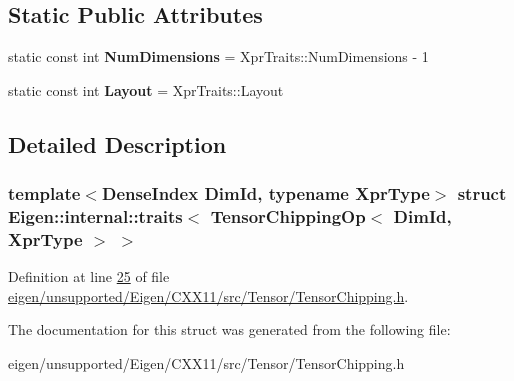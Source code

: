 \subsection*{Static Public Attributes}
\begin{DoxyCompactItemize}
\item 
\mbox{\label{struct_eigen_1_1internal_1_1traits_3_01_tensor_chipping_op_3_01_dim_id_00_01_xpr_type_01_4_01_4_a1204a7d5624c628ff5e05478ed5589eb}} 
static const int {\bfseries Num\+Dimensions} = Xpr\+Traits\+::\+Num\+Dimensions -\/ 1
\item 
\mbox{\label{struct_eigen_1_1internal_1_1traits_3_01_tensor_chipping_op_3_01_dim_id_00_01_xpr_type_01_4_01_4_ae6d8e138be67099dc979aebd983e0523}} 
static const int {\bfseries Layout} = Xpr\+Traits\+::\+Layout
\end{DoxyCompactItemize}


\subsection{Detailed Description}
\subsubsection*{template$<$Dense\+Index Dim\+Id, typename Xpr\+Type$>$\newline
struct Eigen\+::internal\+::traits$<$ Tensor\+Chipping\+Op$<$ Dim\+Id, Xpr\+Type $>$ $>$}



Definition at line \hyperlink{eigen_2unsupported_2_eigen_2_c_x_x11_2src_2_tensor_2_tensor_chipping_8h_source_l00025}{25} of file \hyperlink{eigen_2unsupported_2_eigen_2_c_x_x11_2src_2_tensor_2_tensor_chipping_8h_source}{eigen/unsupported/\+Eigen/\+C\+X\+X11/src/\+Tensor/\+Tensor\+Chipping.\+h}.



The documentation for this struct was generated from the following file\+:\begin{DoxyCompactItemize}
\item 
eigen/unsupported/\+Eigen/\+C\+X\+X11/src/\+Tensor/\+Tensor\+Chipping.\+h\end{DoxyCompactItemize}
